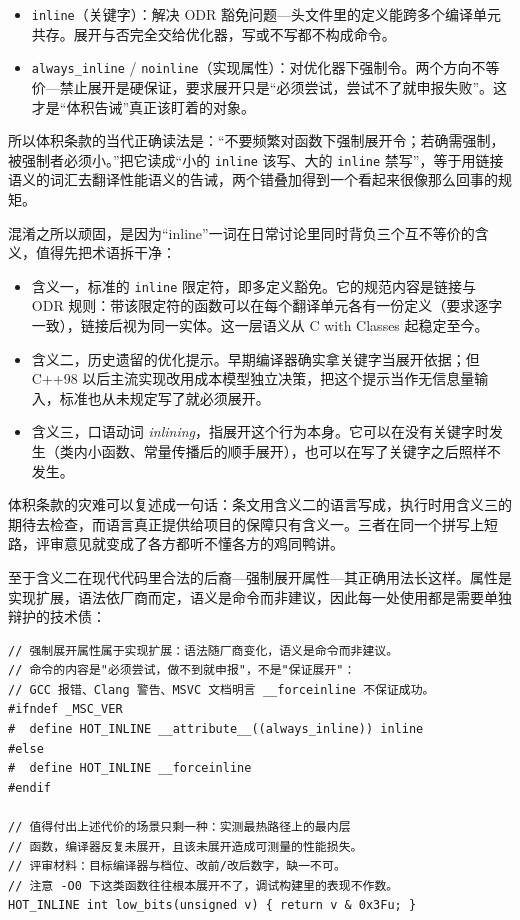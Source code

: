 \documentclass[12pt,a4paper,fontset=fandol]{ctexbook}
\newcommand{\cpp}[1]{C++#1}
\newcommand{\Tp}[1]{\texttt{#1}}
\begin{document}
\begin{compare}[title={两个互不相干的语义层}]
\begin{itemize}
  \item \Tp{inline}（关键字）：解决 ODR 豁免问题---头文件里的定义能跨多个编译单元共存。展开与否完全交给优化器，写或不写都不构成命令。
  \item \Tp{always\_inline} / \Tp{noinline}（实现属性）：对优化器下强制令。两个方向不等价---禁止展开是硬保证，要求展开只是``必须尝试，尝试不了就申报失败''。这才是``体积告诫''真正该盯着的对象。
\end{itemize}
\end{compare}

所以体积条款的当代正确读法是：``不要频繁对函数下强制展开令；若确需强制，被强制者必须小。''把它读成``小的 \Tp{inline} 该写、大的 \Tp{inline} 禁写''，等于用链接语义的词汇去翻译性能语义的告诫，两个错叠加得到一个看起来很像那么回事的规矩。

混淆之所以顽固，是因为``inline''一词在日常讨论里同时背负三个互不等价的含义，值得先把术语拆干净：

\begin{itemize}
  \item 含义一，标准的 \Tp{inline} 限定符，即多定义豁免。它的规范内容是链接与 ODR 规则：带该限定符的函数可以在每个翻译单元各有一份定义（要求逐字一致），链接后视为同一实体。这一层语义从 C with Classes 起稳定至今。
  \item 含义二，历史遗留的优化提示。早期编译器确实拿关键字当展开依据；但 \cpp{98} 以后主流实现改用成本模型独立决策，把这个提示当作无信息量输入，标准也从未规定写了就必须展开。
  \item 含义三，口语动词 \textit{inlining}，指展开这个行为本身。它可以在没有关键字时发生（类内小函数、常量传播后的顺手展开），也可以在写了关键字之后照样不发生。
\end{itemize}

体积条款的灾难可以复述成一句话：条文用含义二的语言写成，执行时用含义三的期待去检查，而语言真正提供给项目的保障只有含义一。三者在同一个拼写上短路，评审意见就变成了各方都听不懂各方的鸡同鸭讲。

至于含义二在现代代码里合法的后裔---强制展开属性---其正确用法长这样。属性是实现扩展，语法依厂商而定，语义是命令而非建议，因此每一处使用都是需要单独辩护的技术债：

\begin{lstlisting}[style=cppstyle]
// 强制展开属性属于实现扩展：语法随厂商变化，语义是命令而非建议。
// 命令的内容是"必须尝试，做不到就申报"，不是"保证展开"：
// GCC 报错、Clang 警告、MSVC 文档明言 __forceinline 不保证成功。
#ifndef _MSC_VER
#  define HOT_INLINE __attribute__((always_inline)) inline
#else
#  define HOT_INLINE __forceinline
#endif

// 值得付出上述代价的场景只剩一种：实测最热路径上的最内层
// 函数，编译器反复未展开，且该未展开造成可测量的性能损失。
// 评审材料：目标编译器与档位、改前/改后数字，缺一不可。
// 注意 -O0 下这类函数往往根本展开不了，调试构建里的表现不作数。
HOT_INLINE int low_bits(unsigned v) { return v & 0x3Fu; }
\end{lstlisting}
\end{document}
